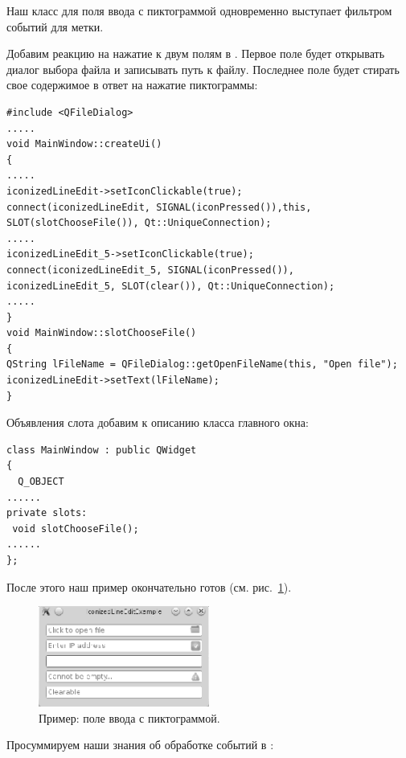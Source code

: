 Наш класс для поля ввода с пиктограммой одновременно выступает фильтром событий для метки.

Добавим реакцию на нажатие к двум полям в . 
Первое поле будет открывать диалог выбора
файла и записывать путь к файлу. Последнее поле будет стирать свое 
содержимое в ответ на нажатие пиктограммы:
\begin{lstlisting}
#include <QFileDialog>
.....
void MainWindow::createUi()
{
.....
iconizedLineEdit->setIconClickable(true);
connect(iconizedLineEdit, SIGNAL(iconPressed()),this, SLOT(slotChooseFile()), Qt::UniqueConnection);
.....
iconizedLineEdit_5->setIconClickable(true);
connect(iconizedLineEdit_5, SIGNAL(iconPressed()),
iconizedLineEdit_5, SLOT(clear()), Qt::UniqueConnection);
.....
}
void MainWindow::slotChooseFile()
{
QString lFileName = QFileDialog::getOpenFileName(this, "Open file");
iconizedLineEdit->setText(lFileName);
}
\end{lstlisting}

Объявления слота  добавим к описанию класса главного окна:
\begin{lstlisting}
class MainWindow : public QWidget
{
  Q_OBJECT
......
private slots:
 void slotChooseFile();
......
};
\end{lstlisting}

После этого наш пример окончательно готов (см. рис.~\ref{ch14:refDrawing1}).

\begin{figure}[htb]
\begin{center}
\includegraphics[width=0.5\textwidth]{img/ris_14_2}
\caption[Пример: поле ввода с пиктограммой.]{Пример: поле ввода с пиктограммой.}
\label{ch14:refDrawing1}
\end{center}
\end{figure}

Просуммируем наши знания об обработке событий в :

